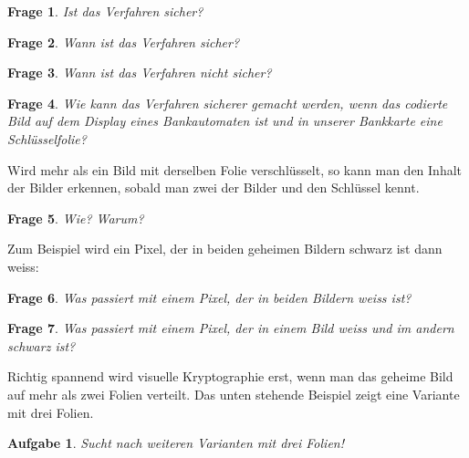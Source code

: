 \documentclass[12pt]{article}
\newtheorem{frage}{Frage}
\newtheorem{aufg}{Aufgabe}
\begin{document}
\begin{frage}
Ist das Verfahren sicher?
\end{frage}

\begin{frage}
Wann ist das Verfahren sicher?
\end{frage}

\begin{frage}
Wann ist das Verfahren nicht sicher?
\end{frage}

\begin{frage}
Wie kann das Verfahren sicherer gemacht werden, wenn das codierte Bild auf dem Display eines Bankautomaten ist und in unserer
Bankkarte eine Schl\"usselfolie?
\end{frage}

Wird mehr als ein Bild mit derselben Folie verschl\"usselt, so kann man den Inhalt der Bilder erkennen, sobald man 
zwei der Bilder und den Schl\"ussel kennt.

\begin{frage}
Wie? Warum?
\end{frage}

Zum Beispiel wird ein Pixel, der in beiden geheimen Bildern schwarz ist dann weiss:

\vspace{7cm}

\begin{frage}
Was passiert mit einem Pixel, der in beiden Bildern weiss ist?
\end{frage}

\begin{frage}
Was passiert mit einem Pixel, der in einem Bild weiss und im andern schwarz ist?
\end{frage}

Richtig spannend wird visuelle Kryptographie erst, wenn man das geheime Bild auf mehr 
als zwei Folien verteilt. Das unten stehende Beispiel zeigt eine Variante mit drei Folien.\\

\vspace{7cm}

\begin{aufg}
Sucht nach weiteren Varianten mit drei Folien!
\end{aufg}
    
   
\end{document}

